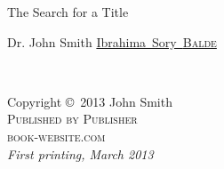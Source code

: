 \documentclass[11pt,fleqn]{book} %
\makeatletter
\newcommand{\ibrahima}{\href{mailto:ibbaldes@yahoo.fr}{Ibrahima~Sory~\textsc{Balde}}\xspace}
\makeatother
\begin{document}

\begingroup
\thispagestyle{empty}
\centering
\vspace*{9cm}
\par\normalfont\fontsize{35}{35}\sffamily\selectfont
The Search for a Title\par %
\vspace*{1cm}
{\Huge Dr. John Smith \ibrahima}\par %
\endgroup


\newpage
~\vfill
\thispagestyle{empty}

\noindent Copyright \copyright\ 2013 John Smith\\ %

\noindent \textsc{Published by Publisher}\\ %

\noindent \textsc{book-website.com}\\ %


\noindent \textit{First printing, March 2013} %


\end{document}
